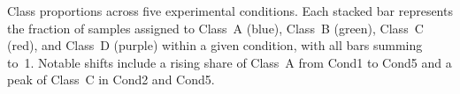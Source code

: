 \caption{Class proportions across five experimental conditions. Each stacked bar represents the fraction of samples assigned to Class~A (blue), Class~B (green), Class~C (red), and Class~D (purple) within a given condition, with all bars summing to~1. Notable shifts include a rising share of Class~A from Cond1 to Cond5 and a peak of Class~C in Cond2 and Cond5.}
